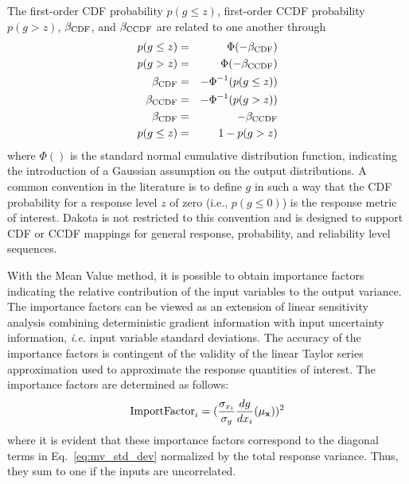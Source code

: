 The first-order CDF probability $p(g \le z)$, first-order 
CCDF probability $p(g > z)$, $\beta_{\rm CDF}$, and $\beta_{\rm CCDF}$ are
related to one another through
\begin{eqnarray}
p(g \le z)  & = & \Phi(-\beta_{\rm CDF})     \label{eq:p_cdf} \\
p(g > z)    & = & \Phi(-\beta_{\rm CCDF})    \label{eq:p_ccdf} \\
\beta_{\rm CDF}  & = & -\Phi^{-1}(p(g \le z)) \label{eq:beta_cdf} \\
\beta_{\rm CCDF} & = & -\Phi^{-1}(p(g > z))   \label{eq:beta_ccdf} \\
\beta_{\rm CDF}  & = & -\beta_{\rm CCDF}       \label{eq:beta_cdf_ccdf} \\
p(g \le z)  & = & 1 - p(g > z)             \label{eq:p_cdf_ccdf}
\end{eqnarray}
where $\Phi()$ is the standard normal cumulative distribution
function, indicating the introduction of a Gaussian assumption on the
output distributions.  A common convention in the literature is to
define $g$ in such a way that the CDF probability for a response level
$z$ of zero (i.e., $p(g \le 0)$) is the response metric of interest.
Dakota is not restricted to this convention and is designed to support
CDF or CCDF mappings for general response, probability, and
reliability level sequences.

With the Mean Value method, it is possible to obtain importance
factors indicating the relative contribution of the input variables to
the output variance.  The importance factors can be viewed as an
extension of linear sensitivity analysis combining deterministic
gradient information with input uncertainty information, \emph{i.e.}
input variable standard deviations. The accuracy of the importance
factors is contingent of the validity of the linear Taylor series
approximation used to approximate the response quantities of interest.
The importance factors are determined as follows:
\begin{equation}
  {\rm ImportFactor}_i
  = ({\frac{\sigma_{x_{i}}}{\sigma_g}}{\frac{dg}{dx_i}(\mu_{\bf x})})^2
\end{equation}
where it is evident that these importance factors correspond to the
diagonal terms in Eq.~\ref{eq:mv_std_dev} normalized by the total
response variance.  Thus, they sum to one if the inputs are uncorrelated.

